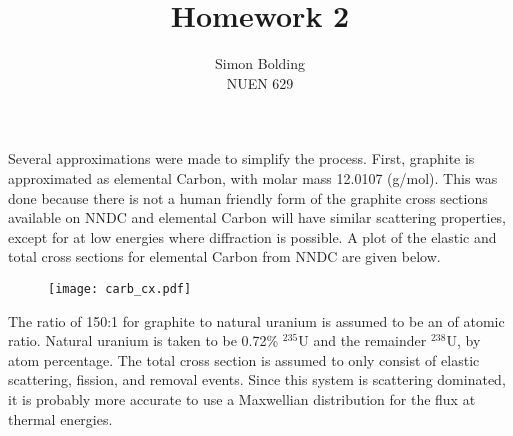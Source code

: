 \documentclass[12pt]{article}
\newenvironment{solnum}[2][Solution]{\begin{trivlist}
\item[\hskip \labelsep {\bfseries #1}\hskip \labelsep {\bfseries #2:}]\hspace{0.3in}\newline\newline}{\end{trivlist}}
\begin{document}
 
 
\title{Homework 2}%
\author{Simon Bolding\\ %
NUEN 629} %
 
\maketitle

\clearpage



\begin{solnum}{1}
    
Several approximations were made to simplify the process.  First, graphite is
approximated as elemental Carbon, with molar mass 12.0107 (g/mol).  This was done because there is not a human
friendly form of the graphite cross sections available on NNDC and elemental Carbon
will have similar scattering properties, except for at low energies where diffraction is
possible.  A plot of the elastic and total cross sections for elemental Carbon from
NNDC are given below.
\begin{figure}[h!]
\centering
\texttt{[image: carb\_cx.pdf]}
\end{figure}


The ratio of 150:1 for graphite to natural uranium is assumed to be an of
atomic ratio.  Natural uranium is
taken to be 0.72\% $^{235}$U and the remainder $^{238}$U, by atom percentage. 
The total cross section
is assumed to only consist of elastic scattering, fission, and removal events.  Since
this system is scattering dominated, it is probably more accurate to use a Maxwellian
distribution for the flux at thermal energies.


\end{solnum}
\end{document}
